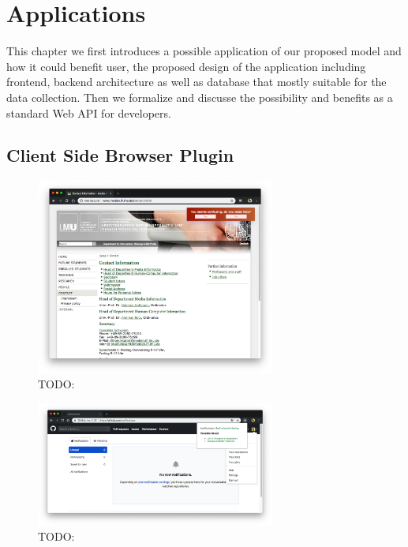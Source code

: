 \section{Applications}
\label{ch:app}

This chapter we first introduces a possible application of our proposed model
and how it could benefit user, the proposed design of the application including frontend, backend architecture as well as database that mostly suitable for the data collection.
Then we formalize and discusse the possibility and benefits as a standard Web API for developers.

\subsection{Client Side Browser Plugin}

\begin{figure}[H]
    \centering
    \includegraphics[width=0.7\textwidth]{figures/proactive-noti}
    \caption{TODO:}
    \label{fig:proactive-noti}
\end{figure}


\begin{figure}[H]
    \centering
    \includegraphics[width=0.7\textwidth]{figures/plugin-predicting-result}
    \caption{TODO:}
    \label{fig:plugin-predict}
\end{figure}

